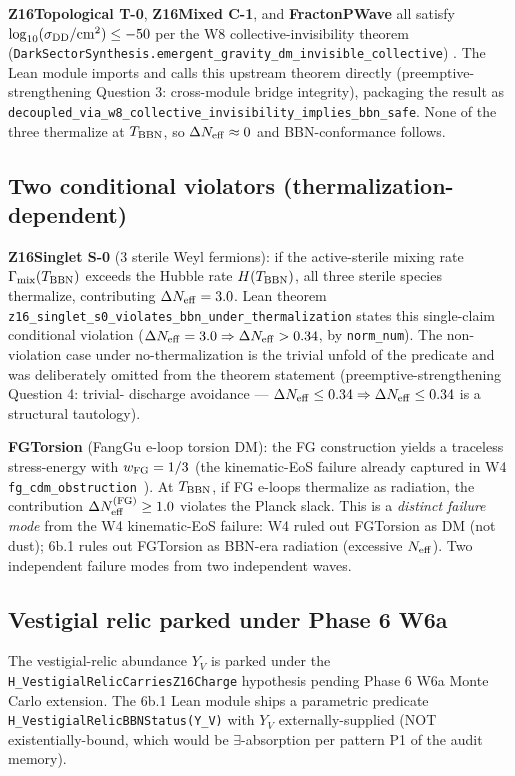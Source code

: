 \documentclass[twocolumn]{revtex4-2}
\newcommand{\dNeff}{\Delta N_{\rm eff}}
\begin{document}
\textbf{Z16Topological T-0}, \textbf{Z16Mixed C-1}, and
\textbf{FractonPWave} all satisfy
$\log_{10}(\sigma_{\rm DD}/\mathrm{cm}^2) \le -50$ per the W8
collective-invisibility theorem
(\texttt{DarkSectorSynthesis.emergent\_gravity\_dm\_invisible\_collective})
\cite{DarkSectorSynthesisLean}. The Lean module imports and calls this
upstream theorem directly (preemptive-strengthening Question 3:
cross-module bridge integrity), packaging the result as
\texttt{decoupled\_via\_w8\_collective\_invisibility\_implies\_bbn\_safe}.
None of the three thermalize at $T_{\rm BBN}$, so $\dNeff \approx 0$
and BBN-conformance follows.

\subsection{Two conditional violators (thermalization-dependent)}

\textbf{Z16Singlet S-0} (3 sterile Weyl fermions): if the active-sterile
mixing rate $\Gamma_{\rm mix}(T_{\rm BBN})$ exceeds the Hubble rate
$H(T_{\rm BBN})$, all three sterile species thermalize, contributing
$\dNeff = 3.0$. Lean theorem
\texttt{z16\_singlet\_s0\_violates\_bbn\_under\_thermalization}
states this single-claim conditional violation
($\dNeff = 3.0 \Rightarrow \dNeff > 0.34$, by \texttt{norm\_num}).
The non-violation case under no-thermalization is the trivial
unfold of the predicate and was deliberately omitted from the
theorem statement (preemptive-strengthening Question 4: trivial-
discharge avoidance — $\dNeff \le 0.34 \Rightarrow \dNeff \le 0.34$
is a structural tautology).

\textbf{FGTorsion} (FangGu e-loop torsion DM): the FG construction
yields a traceless stress-energy with $w_{\rm FG} = 1/3$ (the
kinematic-EoS failure already captured in W4
\texttt{fg\_cdm\_obstruction}~\cite{FangGuLean}). At $T_{\rm BBN}$,
if FG e-loops thermalize as radiation, the contribution
$\dNeff^{\rm (FG)} \ge 1.0$ violates the Planck slack. This is a
\emph{distinct failure mode} from the W4 kinematic-EoS failure: W4
ruled out FGTorsion as DM (not dust); 6b.1 rules out FGTorsion
as BBN-era radiation (excessive $N_{\rm eff}$). Two independent
failure modes from two independent waves.

\subsection{Vestigial relic parked under Phase 6 W6a}

The vestigial-relic abundance $Y_V$ is parked under the
\texttt{H\_VestigialRelicCarriesZ16Charge} hypothesis pending Phase 6
W6a Monte Carlo extension. The 6b.1 Lean module ships a parametric
predicate \texttt{H\_VestigialRelicBBNStatus(Y\_V)} with $Y_V$
externally-supplied (NOT existentially-bound, which would be
$\exists$-absorption per pattern P1 of the audit memory).
\end{document}
